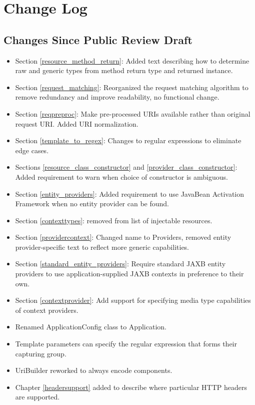 \chapter{Change Log}

\section{Changes Since Public Review Draft}

\begin{itemize}
\item Section \ref{resource_method_return}: Added text describing how to determine raw and generic types from method return type and returned instance.
\item Section \ref{request_matching}: Reorganized the request matching algorithm to remove redundancy and improve readability, no functional change.
\item Section \ref{reqpreproc}: Make pre-processed URIs available rather than original request URI. Added URI normalization.
\item Section \ref{template_to_regex}: Changes to regular expressions to eliminate edge cases.
\item Sections \ref{resource_class_constructor} and \ref{provider_class_constructor}: Added requirement to warn when choice of constructor is ambiguous.
\item Section \ref{entity_providers}: Added requirement to use JavaBean Activation Framework when no entity provider can be found.
\item Section \ref{contexttypes}: removed  from list of injectable resources.
\item Section \ref{providercontext}: Changed name to Providers, removed entity provider-specific text to reflect more generic capabilities.
\item Section \ref{standard_entity_providers}: Require standard JAXB entity providers to use application-supplied JAXB contexts in preference to their own.
\item Section \ref{contextprovider}: Add support for specifying media type capabilities of context providers.
\item Renamed ApplicationConfig class to Application.
\item Template parameters can specify the regular expression that forms their capturing group.
\item UriBuilder reworked to always encode components.
\item Chapter \ref{headersupport} added to describe where particular HTTP headers are supported.
\end{itemize}